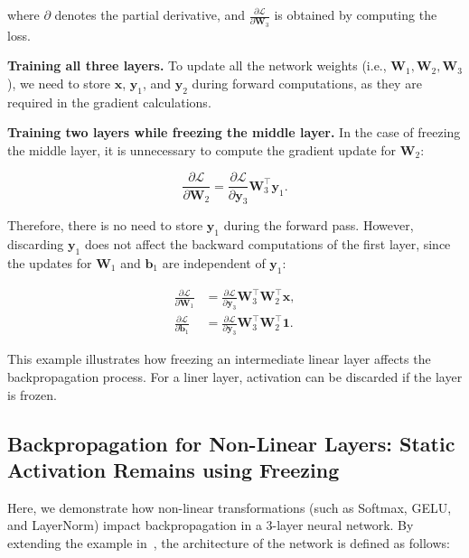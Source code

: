 \documentclass[sigconf]{acmart}
\begin{document}
    where $\partial$ denotes the partial derivative, and $\frac{\partial \mathcal{L}}{\partial \mathbf{W}_3}$ is obtained by computing the loss.
    
    \textbf{Training all three layers.} To update all the network weights (i.e., $\mathbf{W}_1, \mathbf{W}_2, \mathbf{W}_3$), we need to store $\mathbf{x}$, $\mathbf{y}_1$, and $\mathbf{y}_2$ during forward computations, as they are required in the gradient calculations.
    
    \textbf{Training two layers while freezing the middle layer.} In the case of freezing the middle layer, it is unnecessary to compute the gradient update for $\mathbf{W}_2$:
    
    \begin{equation}
        \frac{\partial \mathcal{L}}{\partial \mathbf{W}_2} = \frac{\partial \mathcal{L}}{\partial \mathbf{y}_3} \mathbf{W}_3^\top \mathbf{y}_1.
    \end{equation}
    
    Therefore, there is no need to store $\mathbf{y}_1$ during the forward pass. However, discarding $\mathbf{y}_1$ does not affect the backward computations of the first layer, since the updates for $\mathbf{W}_1$ and $\mathbf{b}_1$ are independent of $\mathbf{y}_1$:
    
    \begin{align}
        \frac{\partial \mathcal{L}}{\partial \mathbf{W}_1} &= \frac{\partial \mathcal{L}}{\partial \mathbf{y}_3} \mathbf{W}_3^\top \mathbf{W}_2^\top \mathbf{x}, \\
        \frac{\partial \mathcal{L}}{\partial \mathbf{b}_1} &= \frac{\partial \mathcal{L}}{\partial \mathbf{y}_3} \mathbf{W}_3^\top \mathbf{W}_2^\top \mathbf{1}.
    \end{align}
    
    This example illustrates how freezing an intermediate linear layer affects the backpropagation process. For a liner layer, activation can be discarded if the layer is frozen.

    \subsection{Backpropagation for Non-Linear Layers: Static Activation Remains using Freezing
    }\label{subsec:appendix-static-activation}

    
    Here, we demonstrate how non-linear transformations (such as Softmax, GELU, and LayerNorm) impact backpropagation in a 3-layer neural network. By extending the example in~\cite{ardakani2024slimfit}, the architecture of the network is defined as follows:
\end{document}
